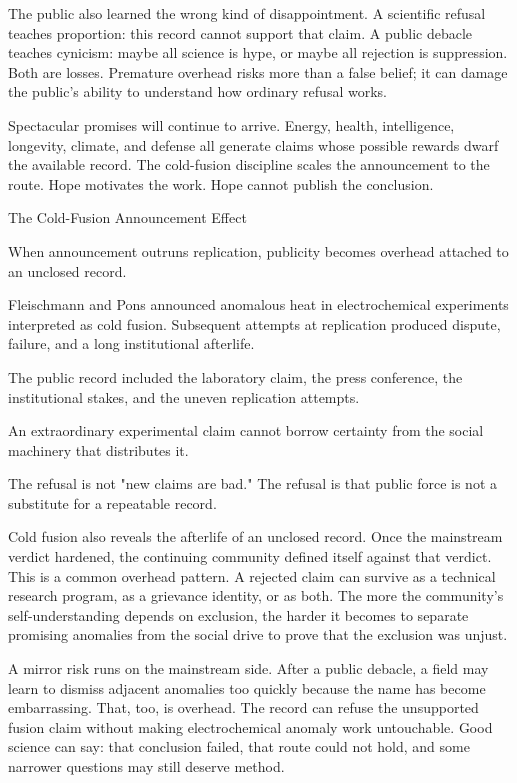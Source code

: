 The public also learned the wrong kind of disappointment. A scientific
refusal teaches proportion: this record cannot support that claim. A
public debacle teaches cynicism: maybe all science is hype, or maybe all
rejection is suppression. Both are losses. Premature overhead risks more
than a false belief; it can damage the public's ability to understand
how ordinary refusal works.

Spectacular promises will continue to arrive. Energy, health,
intelligence, longevity, climate, and defense all generate claims whose
possible rewards dwarf the available record. The cold-fusion discipline
scales the announcement to the route. Hope motivates the work. Hope
cannot publish the conclusion.

\begin{phenom}{The Cold-Fusion Announcement Effect~\cite{fleischmann1989}}
\label{ph:cold-fusion-announcement}

\PhStatement
When announcement outruns replication, publicity becomes overhead attached to
an unclosed record.

\PhOrigin
Fleischmann and Pons announced anomalous heat in electrochemical experiments
interpreted as cold fusion. Subsequent attempts at replication produced dispute,
failure, and a long institutional afterlife.

\PhObservation
The public record included the laboratory claim, the press conference, the
institutional stakes, and the uneven replication attempts.

\PhConstraint
An extraordinary experimental claim cannot borrow certainty from the social
machinery that distributes it.

\PhConsequence
The refusal is not "new claims are bad." The refusal is that public force is
not a substitute for a repeatable record.
\end{phenom}

Cold fusion also reveals the afterlife of an unclosed record. Once the
mainstream verdict hardened, the continuing community defined itself
against that verdict. This is a common overhead pattern. A rejected claim
can survive as a technical research program, as a grievance identity, or
as both. The more the community's self-understanding depends on exclusion,
the harder it becomes to separate promising anomalies from the social
drive to prove that the exclusion was unjust.

A mirror risk runs on the mainstream side. After a public debacle, a field
may learn to dismiss adjacent anomalies too quickly because the name has
become embarrassing. That, too, is overhead. The record can refuse the
unsupported fusion claim without making electrochemical anomaly work
untouchable. Good science can say: that conclusion failed, that route
could not hold, and some narrower questions may still deserve method.

